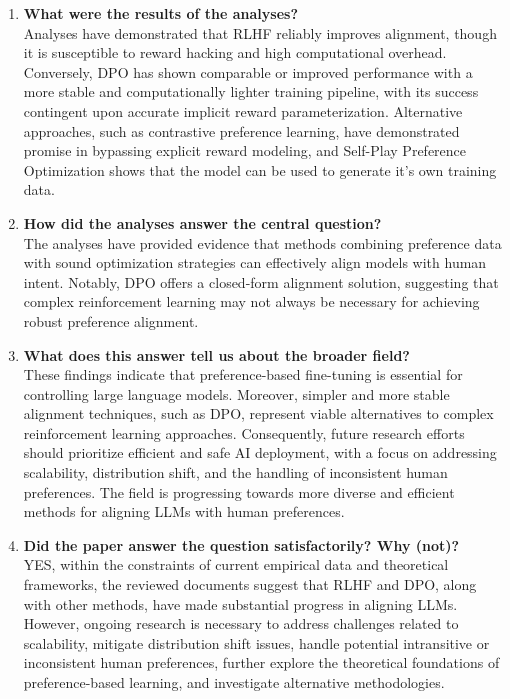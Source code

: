 \documentclass[a4paper,oneside,10pt,ngerman,english]{scrartcl}
\begin{document}
\begin{enumerate}
    \item \textbf{What were the results of the analyses?} \\
    Analyses have demonstrated that RLHF reliably improves alignment, though it is susceptible to reward hacking and high computational overhead. Conversely, DPO has shown comparable or improved performance with a more stable and computationally lighter training pipeline, with its success contingent upon accurate implicit reward parameterization. Alternative approaches, such as contrastive preference learning, have demonstrated promise in bypassing explicit reward modeling, and Self-Play Preference Optimization shows that the model can be used to generate it's own training data.

    \item \textbf{How did the analyses answer the central question?} \\
    The analyses have provided evidence that methods combining preference data with sound optimization strategies can effectively align models with human intent. Notably, DPO offers a closed-form alignment solution, suggesting that complex reinforcement learning may not always be necessary for achieving robust preference alignment.

    \item \textbf{What does this answer tell us about the broader field?} \\
    These findings indicate that preference-based fine-tuning is essential for controlling large language models. Moreover, simpler and more stable alignment techniques, such as DPO, represent viable alternatives to complex reinforcement learning approaches. Consequently, future research efforts should prioritize efficient and safe AI deployment, with a focus on addressing scalability, distribution shift, and the handling of inconsistent human preferences. The field is progressing towards more diverse and efficient methods for aligning LLMs with human preferences.

    \item \textbf{Did the paper answer the question satisfactorily? Why (not)?} \\
    YES, within the constraints of current empirical data and theoretical frameworks, the reviewed documents suggest that RLHF and DPO, along with other methods, have made substantial progress in aligning LLMs. However, ongoing research is necessary to address challenges related to scalability, mitigate distribution shift issues, handle potential intransitive or inconsistent human preferences, further explore the theoretical foundations of preference-based learning, and investigate alternative methodologies.
\end{enumerate}
\end{document}
